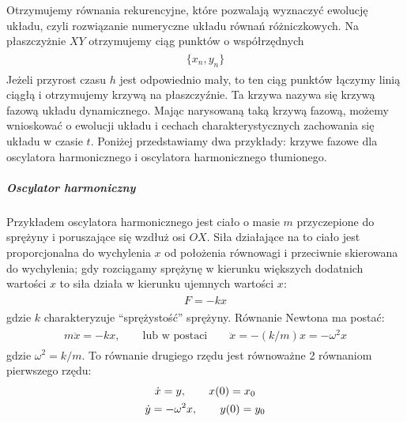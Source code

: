 \documentclass[a4paper,12pt,polish]{sphinxmanual}
\begin{document}
Otrzymujemy równania rekurencyjne, które pozwalają wyznaczyć ewolucję układu, czyli rozwiązanie numeryczne układu równań różniczkowych. Na płaszczyżnie $XY$ otrzymujemy ciąg punktów o współrzędnych
\label{ch1/chI021:equation-eqn52}\begin{gather}
\begin{split}\{x_n, y_n\}\end{split}\label{ch1/chI021-eqn52}
\end{gather}
Jeżeli przyrost czasu $h$ jest odpowiednio mały, to ten ciąg punktów łączymy linią ciągłą i otrzymujemy  krzywą na płaszczyźnie. Ta krzywa nazywa się krzywą fazową układu dynamicznego.   Mając narysowaną taką krzywą fazową, możemy wnioskować o ewolucji układu i cechach charakterystycznych zachowania się układu w czasie $t$.       Poniżej przedstawiamy dwa przykłady: krzywe fazowe dla oscylatora harmonicznego  i oscylatora harmonicznego tłumionego.


\subparagraph{Oscylator harmoniczny}
\label{ch1/chI021:oscylator-harmoniczny}
Przykładem oscylatora harmonicznego jest ciało o masie $m$ przyczepione do sprężyny i poruszające się wzdłuż osi $OX$.  Siła działające na to ciało jest proporcjonalna do wychylenia $x$ od położenia równowagi i przeciwnie skierowana do wychylenia; gdy rozciągamy sprężynę w kierunku większych dodatnich wartości $x$ to siła działa w kierunku ujemnych wartości $x$:
\label{ch1/chI021:equation-eqn53}\begin{gather}
\begin{split} F = -kx\end{split}\label{ch1/chI021-eqn53}
\end{gather}
gdzie $k$ charakteryzuje ``sprężystość'' sprężyny. Równanie Newtona ma postać:
\label{ch1/chI021:equation-eqn54}\begin{gather}
\begin{split}m\ddot x = -kx, \quad \quad \mbox{lub w postaci} \quad \quad \ddot x = -(k/m) x = -\omega^2 x\end{split}\label{ch1/chI021-eqn54}
\end{gather}
gdzie $\omega^2 = k/m$. To równanie drugiego rzędu jest równoważne 2 równaniom pierwszego rzędu:
\label{ch1/chI021:equation-eqn55}\begin{gather}
\begin{split}\dot x = y, \quad \quad x(0) = x_0\end{split}\label{ch1/chI021-eqn55}\\\begin{split}\dot y = -\omega^2 x, \quad \quad y(0) = y_0\end{split}\notag
\end{gather}
\end{document}
